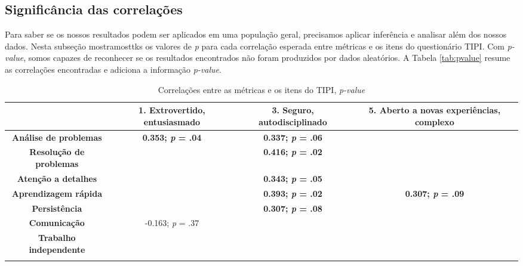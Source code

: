 \subsection{Significância das correlações}

Para saber se os nossos resultados podem ser aplicados em uma população geral, precisamos aplicar inferência e analisar além dos nossos dados.
Nesta subseção mostramosttks os valores de \textit{p} para cada correlação esperada entre métricas e os itens do questionário TIPI.
Com \textit{p-value}, somos capazes de reconhecer se os resultados encontrados não foram produzidos por dados aleatórios.
A Tabela \ref{tab:pvalue} resume as correlações encontradas e adiciona a informação \textit{p-value}.

\begin{sidewaystable}[ph!]
\footnotesize
\caption{\small Correlações entre as métricas e os itens do TIPI, \textsl{p-value}}
\renewcommand{\arraystretch}{1.4} 
\centering
\begin{tabular}{lccc}

    \toprule
          & \textbf{1. Extrovertido, entusiasmado} & \textbf{3. Seguro, autodisciplinado} & \textbf{5. Aberto a novas experiências, complexo} \\
    \midrule
    \multicolumn{1}{c}{\textbf{Análise de problemas}} 	& \textbf{0.353; \textsl{p} = .04}  & \textbf{0.337; \textsl{p} = .06} & \textbf{} \\
    \multicolumn{1}{c}{\textbf{Resolução de problemas}} &																	  & \textbf{0.416; \textsl{p} = .02} & \textbf{} \\
    \multicolumn{1}{c}{\textbf{Atenção a detalhes}} 		&																		& \textbf{0.343; \textsl{p} = .05} & \\
    \multicolumn{1}{c}{\textbf{Aprendizagem rápida}} 		&																		& \textbf{0.393; \textsl{p} = .02} & \textbf{0.307; \textsl{p} = .09} \\
    \multicolumn{1}{c}{\textbf{Persistência}} 					&																		& \textbf{0.307; \textsl{p} = .08} & \\
    \multicolumn{1}{c}{\textbf{Comunicação}} 						& -0.163; \textsl{p} = .37					&																	 &  \\
    \multicolumn{1}{c}{\textbf{Trabalho independente}} 	&																		&																	 &  \\
		
          &  &  &  \\


\end{tabular}
\end{sidewaystable}
